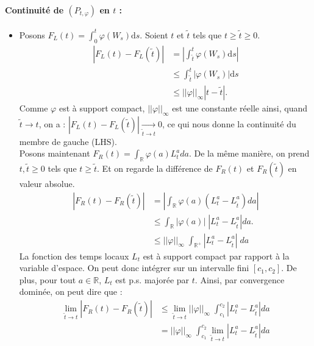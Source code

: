 \documentclass[openany]{book}
\makeatletter
\newcommand{\R}{\mathbb{R}}
\newcommand{\1}{\mathbbm{1}}
\newcommand{\refocc}{\hyperref[eq:occupation]{$(P_{t,\varphi})$}}
\renewcommand{\d}{\mathrm{d}}
\renewenvironment{proof}[1][\textbf{\textit{Démonstration}}]{%
  \par\pushQED{\qed}%
  \normalfont\topsep6\p@\@plus6\p@\relax
  \trivlist\item[\hskip\labelsep
    #1\@addpunct{.}]\ignorespaces
}{%
  \popQED\endtrivlist\@endpefalse
}
\theoremstyle{thmfont}
\theoremstyle{deffont}
\theoremstyle{thmfont}
\theoremstyle{deffont}
\makeatother
\begin{document}
\begin{proof}
    \noindent \paragraph{Continuité de \refocc \; en $t$ :}
    \label{proof:continuite_occ}
    \begin{itemize}
    \item[]Posons $F_L(t) = \int_0^t \varphi(W_s) \d s$. Soient $t$ et $\tilde{t}$ tels que $t \geq \tilde{t} \geq 0$.
    \begin{align*}
      |F_L(t) - F_L(\tilde{t})| &= \left| \int_{\tilde{t}}^t \varphi(W_s) \d s\right|\\
                               & \leq \int_{\tilde{t}}^t |\varphi(W_s)| \d s\\
                               & \leq ||\varphi||_\infty |t-\tilde{t}|.
    \end{align*}
    Comme $\varphi$ est à support compact, $||\varphi||_\infty$ est une constante réelle ainsi, quand $\tilde{t} \rightarrow t$, on a : $|F_L(t) - F_L(\tilde{t})| \xrightarrow[\tilde t \to t]{} 0$,
    ce qui nous donne la continuité du membre de gauche (LHS).\\

    Posons maintenant $F_R(t) = \int_\R \varphi(a) L_t^a da$. De la même manière, on prend $t, \tilde{t} \geq 0$ tels que $t \geq \tilde{t}$. Et on regarde la différence de $F_R(t)$ et $F_R(\tilde{t})$ en valeur absolue.
    \begin{align*}
      |F_R(t) - F_R(\tilde{t})| &= \left|\int_\R \varphi(a) (L_t^a - L_{\tilde{t}}^a) da\right|\\
                               &\leq \int_\R |\varphi(a)|\; |L_t^a - L_{\tilde{t}}^a|da.\\
                                & \leq ||\varphi||_\infty\; \int_{\R^+} |L_t^a - L_{\tilde t}^a|\;da
\end{align*}
La fonction des temps locaux $L_t$ est à support compact par rapport à la variable d'espace. On peut donc intégrer sur un intervalle fini $[c_1, c_2]$. De plus, pour tout $a \in \R$, $L_t$ est p.s. majorée par $t$. Ainsi, par convergence dominée, on peut dire que :
\begin{align*}
  \lim_{\tilde t \to t}|F_R(t) - F_R(\tilde{t})| &\leq \lim_{\tilde t \to t} ||\varphi||_\infty\; \int_{c_1}^{c_2} |L_t^a - L_{\tilde t}^a | da \\
                                               &= ||\varphi||_\infty\;\int_{c_1}^{c_2} \lim_{\tilde t \to t} |L_t^a - L_{\tilde t}^a | da
    \end{align*}


\end{itemize}
\end{proof}
\end{document}
